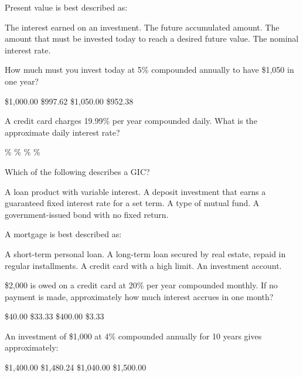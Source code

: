 \documentclass[addpoints]{exam}
\begin{document}
\begin{questions}
\question[1]
Present value is best described as:
\begin{choices}
    \choice The interest earned on an investment.
    \choice The future accumulated amount.
    \correctchoice The amount that must be invested today to reach a desired future value.
    \choice The nominal interest rate.
\end{choices}

\question[1]
How much must you invest today at 5\% compounded annually to have \$1{,}050 in one year?
\begin{choices}
    \correctchoice \$1{,}000.00
    \choice \$997.62
    \choice \$1{,}050.00
    \choice \$952.38
\end{choices}

\question[1]
A credit card charges 19.99\% per year compounded daily. What is the approximate daily interest rate?
\begin{choices}
    \%
    \%
    \%
    \%
\end{choices}

\question[1]
Which of the following describes a GIC?
\begin{choices}
    \choice A loan product with variable interest.
    \correctchoice A deposit investment that earns a guaranteed fixed interest rate for a set term.
    \choice A type of mutual fund.
    \choice A government-issued bond with no fixed return.
\end{choices}

\question[1]
A mortgage is best described as:
\begin{choices}
    \choice A short-term personal loan.
    \correctchoice A long-term loan secured by real estate, repaid in regular installments.
    \choice A credit card with a high limit.
    \choice An investment account.
\end{choices}

\question[1]
\$2{,}000 is owed on a credit card at 20\% per year compounded monthly. If no payment is made, approximately how much interest accrues in one month?
\begin{choices}
    \choice \$40.00
    \correctchoice \$33.33
    \choice \$400.00
    \choice \$3.33
\end{choices}

\question[1]
An investment of \$1{,}000 at 4\% compounded annually for 10 years gives approximately:
\begin{choices}
    \choice \$1{,}400.00
    \correctchoice \$1{,}480.24
    \choice \$1{,}040.00
    \choice \$1{,}500.00
\end{choices}


\end{questions}
\end{document}
